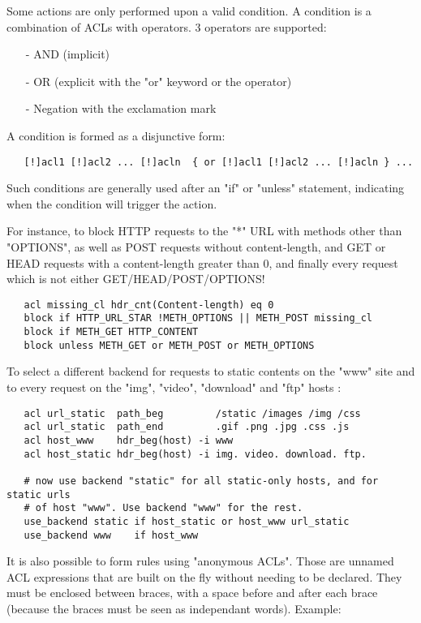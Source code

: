 Some actions are only performed upon a valid condition. A condition is a
combination of ACLs with operators. 3 operators are supported:

\begin{itemize}
\item[-] AND (implicit)
\item[-] OR  (explicit with the "or" keyword or the \chr{||} operator)
\item[-] Negation with the exclamation mark \chr{!}
\end{itemize}

A condition is formed as a disjunctive form:

\begin{verbatim}
   [!]acl1 [!]acl2 ... [!]acln  { or [!]acl1 [!]acl2 ... [!]acln } ...
\end{verbatim}

Such conditions are generally used after an "if" or "unless" statement,
indicating when the condition will trigger the action.

For instance, to block HTTP requests to the "*" URL with methods other than
"OPTIONS", as well as POST requests without content-length, and GET or HEAD
requests with a content-length greater than 0, and finally every request which
is not either GET/HEAD/POST/OPTIONS!

\begin{verbatim}
   acl missing_cl hdr_cnt(Content-length) eq 0
   block if HTTP_URL_STAR !METH_OPTIONS || METH_POST missing_cl
   block if METH_GET HTTP_CONTENT
   block unless METH_GET or METH_POST or METH_OPTIONS
\end{verbatim}

To select a different backend for requests to static contents on the "www" site
and to every request on the "img", "video", "download" and "ftp" hosts :

\begin{verbatim}
   acl url_static  path_beg         /static /images /img /css
   acl url_static  path_end         .gif .png .jpg .css .js
   acl host_www    hdr_beg(host) -i www
   acl host_static hdr_beg(host) -i img. video. download. ftp.

   # now use backend "static" for all static-only hosts, and for static urls
   # of host "www". Use backend "www" for the rest.
   use_backend static if host_static or host_www url_static
   use_backend www    if host_www
\end{verbatim}

It is also possible to form rules using "anonymous ACLs". Those are unnamed ACL
expressions that are built on the fly without needing to be declared. They must
be enclosed between braces, with a space before and after each brace (because
the braces must be seen as independant words). Example:

